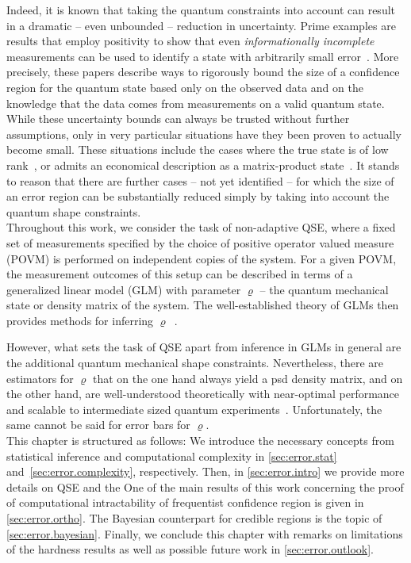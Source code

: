 Indeed, it is known that taking the quantum constraints into account can result in a dramatic -- even unbounded -- reduction in uncertainty.
Prime examples are results that employ positivity to show that even \emph{informationally incomplete} measurements can be used to identify a state with arbitrarily small error~\cite{Cramer_2010_Efficient,Gross_2010_Quantum,Gross_2011_Recovering,Flammia_2012_Quantum,Nickl_2013_Confidence,Kalev_2015_Quantum}.
More precisely, these papers describe ways to rigorously bound the size of a confidence region for the quantum state based only on the observed data and on the knowledge that the data comes from measurements on a valid quantum state.
While these uncertainty bounds can always be trusted without further assumptions, only in very particular situations have they been proven to actually become small.
These situations include the cases where the true state is of low rank~\cite{Flammia_2012_Quantum,Nickl_2013_Confidence}, or admits an economical description as a matrix-product state~\cite{Cramer_2010_Efficient}.
It stands to reason that there are further cases -- not yet identified -- for which the size of an error region can be substantially reduced simply by taking into account the quantum shape constraints.\\


Throughout this work, we consider the task of non-adaptive QSE, where a fixed set of measurements specified by the choice of positive operator valued measure (POVM) is performed on independent copies of the system.
For a given POVM, the measurement outcomes of this setup can be described in terms of a generalized linear model (GLM) with parameter $\varrho$ -- the quantum mechanical state or density matrix of the system.
The well-established theory of GLMs then provides methods for inferring $\varrho$~\cite{Mccullagh_1989_Generalized}.

However, what sets the task of QSE apart from inference in GLMs in general are the additional quantum mechanical shape constraints.
Nevertheless, there are estimators for $\varrho$ that on the one hand always yield a psd density matrix, and on the other hand, are well-understood theoretically with near-optimal performance and scalable to intermediate sized quantum experiments~\cite{Paris_2004_Quantum}.
Unfortunately, the same cannot be said for error bars for $\varrho$.\\


This chapter is structured as follows:
We introduce the necessary concepts from statistical inference and computational complexity in \cref{sec:error.stat} and~\ref{sec:error.complexity}, respectively.
Then, in \cref{sec:error.intro} we provide more details on QSE and the
One of the main results of this work concerning the proof of computational intractability of frequentist confidence region is given in \cref{sec:error.ortho}.
The Bayesian counterpart for credible regions is the topic of \cref{sec:error.bayesian}.
Finally, we conclude this chapter with remarks on limitations of the hardness results as well as possible future work in \cref{sec:error.outlook}.

